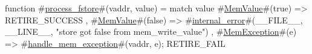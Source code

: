 function #\hyperref[sailRISCVzprocesszyfstore]{process\_fstore}#(vaddr, value) =
  match value {
    #\hyperref[sailRISCVzMemValue]{MemValue}#(true)  => { RETIRE_SUCCESS },
    #\hyperref[sailRISCVzMemValue]{MemValue}#(false) => { #\hyperref[sailRISCVzinternalzyerror]{internal\_error}#(__FILE__, __LINE__, "store got false from mem_write_value") },
    #\hyperref[sailRISCVzMemException]{MemException}#(e) => { #\hyperref[sailRISCVzhandlezymemzyexception]{handle\_mem\_exception}#(vaddr, e); RETIRE_FAIL }
  }

